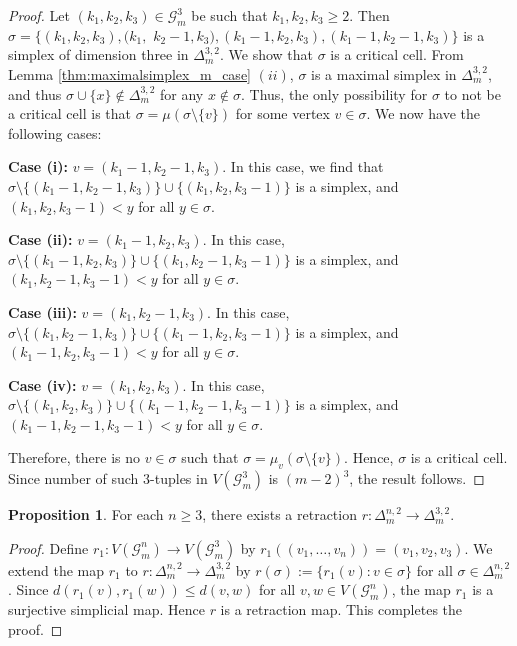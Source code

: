 \documentclass{amsart}
\theoremstyle{definition}
\newtheorem{proposition}[theorem]{Proposition}
\theoremstyle{remark}
\numberwithin{equation}{section}
\newcommand{\D}{\Delta}
\newcommand{\G}{\mathcal{G}}
\begin{document}
\begin{proof} 
	Let $(k_1,k_2,k_3)\in \mathcal{G}_m^3$ be  such that $k_1,k_2,k_3\geq 2$.
	Then $\sigma = \{(k_1,k_2,k_3), (k_1,$ $k_2-1,k_3), (k_1-1,k_2,k_3), (k_1-1,k_2-1,k_3)\}$ is a simplex of dimension three in $\D_m^{3,2}$. We show that $\sigma$ is a critical cell. 
	From Lemma \ref{thm:maximalsimplex_m_case} $(ii)$, $\sigma$ is a maximal simplex in $\D_m^{3,2}$, and thus $\sigma \cup \{x\} \notin \D_m^{3,2}$ for any $x \notin \sigma$. Thus, the only possibility for $\sigma$ to not be a critical cell is that  $\sigma = \mu(\sigma \setminus \{v\})$ for some vertex $v \in \sigma$.  We now have the following cases:

    \smallskip
    
	\noindent\textbf{Case (i):} $v = (k_1-1, k_2-1, k_3)$. In this case, we find that $\sigma \setminus \{(k_1-1,k_2-1,k_3)\} \cup \{(k_1,k_2,k_3-1)\}$ is a simplex, and $(k_1,k_2,k_3-1) < y$ for all $y \in \sigma$.
    
	\smallskip
    
	
  
    
	\noindent
	\textbf{Case (ii):} $v = (k_1-1,k_2,k_3)$. In this case,  $\sigma \setminus \{(k_1-1,k_2,k_3)\} \cup \{(k_1,k_2-1,k_3-1)\}$ is a simplex, and $(k_1,k_2-1,k_3-1) < y$ for all $y \in \sigma$.

    \smallskip



    \noindent
	\textbf{Case (iii):} $v = (k_1,k_2-1,k_3)$. In this case,  $\sigma \setminus \{(k_1,k_2-1,k_3)\} \cup \{(k_1-1,k_2,k_3-1)\}$ is a simplex, and $(k_1-1,k_2,k_3-1) < y$ for all $y \in \sigma$.

  \smallskip

	\noindent
	\textbf{Case (iv):} $v = (k_1,k_2,k_3)$. In this case,  $\sigma \setminus \{(k_1,k_2,k_3)\} \cup \{(k_1-1,k_2-1,k_3-1)\}$ is a simplex, and $(k_1-1,k_2-1,k_3-1) < y$ for all $y \in \sigma$.
	
	\smallskip
    
	Therefore, there is no $v \in \sigma$ such that $\sigma = \mu_v(\sigma \setminus \{v\})$. Hence, $\sigma$ is a critical cell. Since number of such $3$-tuples in $V(\mathcal{G}_m^3)$ is  $(m-2)^3$, the result follows.
\end{proof}


\begin{proposition}\label{prop:retract}
	For each $n \geq 3$, there exists a retraction  $r: \D_m^{n, 2} \to \D_m^{3, 2}$.  
\end{proposition}
\begin{proof}
	
	Define $r_{1}: V(\G_m^n) \to  V(\G_m^3)$ by $r_1((v_1, \ldots, v_n)) = (v_1, v_2, v_3)$. 
	We  extend the map $r_{1}$ to $r : \D_m^{n, 2} \to \D_m^{3, 2}$ by 
	$r(\sigma) := \{r_1(v) : v \in \sigma\}$ for all $\sigma \in \D_m^{n, 2}$. Since $d(r_1(v), r_1(w)) \leq d(v, w)$ for all $v , w \in V(\G_m^n)$, the map $r_1$ is a surjective simplicial map.  Hence $r$ is a retraction map. This completes the proof. 
\end{proof}
\end{document}
